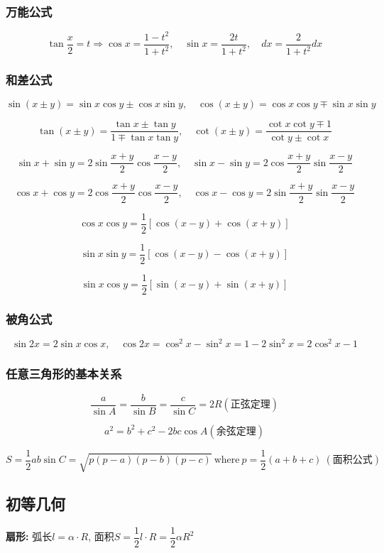 \subsubsection{万能公式}
$$
\tan \frac{x}{2}=t \Rightarrow
\cos x =\frac{ 1-t^2}{1+t^2},\quad
\sin x=\frac{2t}{1+t^2},\quad
dx=\frac{2}{1+t^2}dx
$$
\subsubsection{和差公式}
$$
\sin(x\pm y)=\sin x \cos y \pm \cos x \sin y,\quad \cos(x \pm y)=\cos x \cos y \mp \sin x \sin y
$$

$$
\tan(x \pm y)=\frac{\tan x \pm \tan y}{1 \mp \tan x \tan y}, \quad
\cot (x\pm y)=\frac{\cot x \cot y \mp 1}{\cot y \pm \cot x}
$$

$$
\sin x+\sin y=2\sin \frac{x+y}{2} \cos \frac{ x -y }{2}, \quad
\sin x-\sin y=2\cos \frac{x+y}{2} \sin \frac{ x -y }{2}
$$

$$
\cos x+\cos y=2\cos \frac{x+y}{2} \cos \frac{ x -y }{2}, \quad
\cos x-\cos y=2\sin \frac{x+y}{2} \sin \frac{ x -y }{2}
$$

$$
\cos x \cos y=\frac{ 1}{2}[\cos(x-y)+\cos(x+y)]
$$

$$
\sin x \sin y=\frac{ 1}{2}[\cos(x-y)-\cos(x+y)]
$$

$$
\sin x \cos y=\frac{ 1}{2}[\sin(x-y)+\sin(x+y)]
$$

\subsubsection{被角公式}
$$
\sin 2x=2\sin x \cos x,\quad \cos 2x=\cos^2 x-\sin ^2 x=1-2\sin^2 x=2\cos^2 x -1
$$

\subsubsection{任意三角形的基本关系}
$$
\frac{a}{\sin A}=
\frac{b}{\sin B}=
\frac{c}{\sin C}=
2R(\mbox{正弦定理})
$$

$$
a^2=b^2+c^2-2bc\cos A (\mbox{余弦定理})
$$

$$
S= \frac{ 1}{2}ab\sin C=\sqrt{p(p-a)(p-b)(p-c)}~\mbox{where}~p=\frac{1}{2}(a+b+c)~ (\mbox{面积公式})
$$

\subsection{初等几何}
\textbf{扇形:}
弧长$l=\alpha \cdot R$, \quad
面积$S=\dfrac{1}{2}l\cdot R=\dfrac{1}{2}\alpha R^2$

